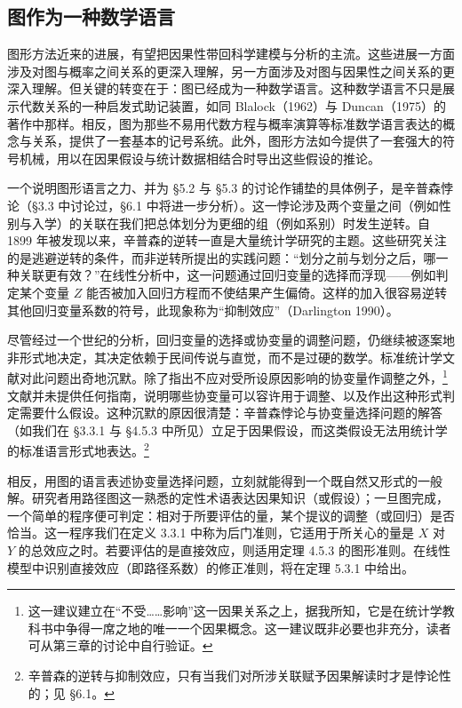 \subsection{图作为一种数学语言}

图形方法近来的进展，有望把因果性带回科学建模与分析的主流。这些进展一方面涉及对图与概率之间关系的更深入理解，另一方面涉及对图与因果性之间关系的更深入理解。但关键的转变在于：图已经成为一种数学语言。这种数学语言不只是展示代数关系的一种启发式助记装置，如同 Blalock（1962）与 Duncan（1975）的著作中那样。相反，图为那些不易用代数方程与概率演算等标准数学语言表达的概念与关系，提供了一套基本的记号系统。此外，图形方法如今提供了一套强大的符号机械，用以在因果假设与统计数据相结合时导出这些假设的推论。

一个说明图形语言之力、并为 \S 5.2 与 \S 5.3 的讨论作铺垫的具体例子，是辛普森悖论（\S 3.3 中讨论过，\S 6.1 中将进一步分析）。这一悖论涉及两个变量之间（例如性别与入学）的关联在我们把总体划分为更细的组（例如系别）时发生逆转。自 1899 年被发现以来，辛普森的逆转一直是大量统计学研究的主题。这些研究关注的是逃避逆转的条件，而非逆转所提出的实践问题：“划分之前与划分之后，哪一种关联更有效？”在线性分析中，这一问题通过回归变量的选择而浮现——例如判定某个变量 $Z$ 能否被加入回归方程而不使结果产生偏倚。这样的加入很容易逆转其他回归变量系数的符号，此现象称为“抑制效应”（Darlington 1990）。

尽管经过一个世纪的分析，回归变量的选择或协变量的调整问题，仍继续被逐案地非形式地决定，其决定依赖于民间传说与直觉，而不是过硬的数学。标准统计学文献对此问题出奇地沉默。除了指出不应对受所设原因影响的协变量作调整之外，\footnote{这一建议建立在“不受……影响”这一因果关系之上，据我所知，它是在统计学教科书中争得一席之地的唯一一个因果概念。这一建议既非必要也非充分，读者可从第三章的讨论中自行验证。}文献并未提供任何指南，说明哪些协变量可以容许用于调整、以及作出这种形式判定需要什么假设。这种沉默的原因很清楚：辛普森悖论与协变量选择问题的解答（如我们在 \S 3.3.1 与 \S 4.5.3 中所见）立足于因果假设，而这类假设无法用统计学的标准语言形式地表达。\footnote{辛普森的逆转与抑制效应，只有当我们对所涉关联赋予因果解读时才是悖论性的；见 \S 6.1。}

相反，用图的语言表述协变量选择问题，立刻就能得到一个既自然又形式的一般解。研究者用路径图这一熟悉的定性术语表达因果知识（或假设）；一旦图完成，一个简单的程序便可判定：相对于所要评估的量，某个提议的调整（或回归）是否恰当。这一程序我们在定义 3.3.1 中称为后门准则，它适用于所关心的量是 $X$ 对 $Y$ 的总效应之时。若要评估的是直接效应，则适用定理 4.5.3 的图形准则。在线性模型中识别直接效应（即路径系数）的修正准则，将在定理 5.3.1 中给出。

